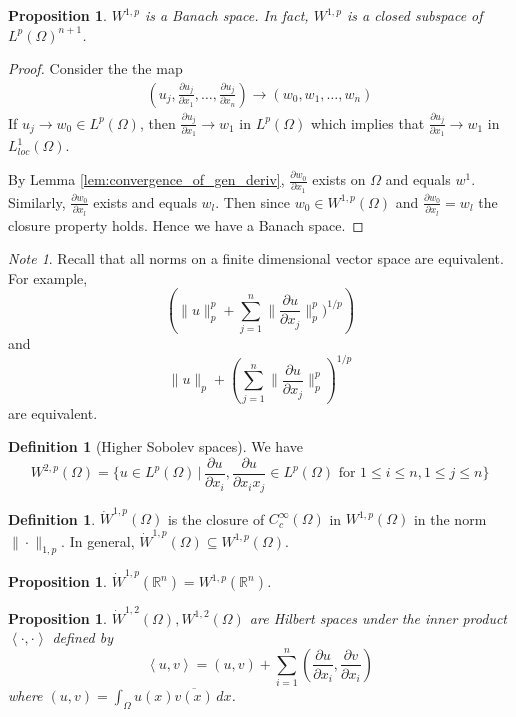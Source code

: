 \documentclass[10pt, oneside, reqno]{amsart}
\theoremstyle{plain}%
\newtheorem{prop}[thm]{Proposition}
\numberwithin{equation}{section}
\theoremstyle{definition}
\newtheorem{defn}[thm]{Definition}
\theoremstyle{remark}
\newtheorem*{note}{Note}
\newcommand{\given}{ \, | \,}
\newcommand{\R}{\mathbb{R}}
\newcommand{\iprod}[1]{\left\langle #1 \right\rangle}
\begin{document}
\begin{prop}
	$W^{1, p}$ is a Banach space.  In fact, $W^{1,p}$ is a closed subspace of $L^p(\Omega)^{n+1}$.
\end{prop}

\newcommand{\parder}[2]{\frac{\partial #1}{\partial #2}}
\begin{proof}
	Consider the the map \begin{align*}
		(u_j, \parder{u_j}{x_1}, \dots, \parder{u_j}{x_n}) \rightarrow (w_0, w_1, \dots, w_n)
	\end{align*}  If $u_j \rightarrow w_0 \in L^p(\Omega)$, then $\parder{u_j}{x_1} \rightarrow w_1$ in $L^p(\Omega)$ which implies that $\parder{u_j}{x_1} \rightarrow w_1$ in $L^1_{loc}(\Omega)$.
	
	By Lemma \ref{lem:convergence_of_gen_deriv}, $\parder{w_0}{x_1}$ exists on $\Omega$ and equals $w^1$.  Similarly, $\parder{w_0}{x_l}$ exists and equals $w_l$.  Then since $w_0 \in W^{1, p}(\Omega)$ and $\parder{w_0}{x_l} = w_l$ the closure property holds.  Hence we have a Banach space.
\end{proof}

\begin{note}
	Recall that all norms on a finite dimensional vector space are equivalent.  For example, \[
		\left( \| u \|_p^p + \sum_{j=1}^n \| \parder{u}{x_j}\|_p^p)^{1/p} \right)
	\] and \[
		\| u \|_p + \left( \sum_{j=1}^n \| \parder{u}{x_j} \|_p^p \right)^{1/p}
	\] are equivalent.
\end{note}


\begin{defn}[Higher Sobolev spaces]
	We have \[
	W^{2, p}(\Omega) = \{ u \in L^p(\Omega) \given \frac{\partial u}{\partial x_i}, \parder{u}{x_i x_j} \in L^p(\Omega) \text{ for } 1 \leq i \leq n, 1 \leq j \leq n \}
	\]
\end{defn}

\begin{defn}
	$\dot W^{1, p}(\Omega)$ is the closure of $C^\infty_c(\Omega)$ in $W^{1, p}(\Omega)$ in the norm $\| \cdot \|_{1, p}$.  	
	In general, $\dot W^{1, p}(\Omega) \subseteq W^{1, p}(\Omega)$.
\end{defn}

\begin{prop}
	$\dot W^{1, p}(\R^n) = W^{1, p}(\R^n)$.  
\end{prop}

\begin{prop}
	$\dot W^{1, 2}(\Omega), W^{1, 2}(\Omega)$ are Hilbert spaces under the inner product $\iprod{\cdot, \cdot}$ defined by \[
		\iprod{u, v} = (u, v) + \sum_{i=1}^n \left(\parder{u}{x_i}, \parder{v}{x_i}\right)
	\] where $(u, v) = \int_\Omega u(x) \overline{v(x)} \, dx$.
\end{prop}
\end{document}
